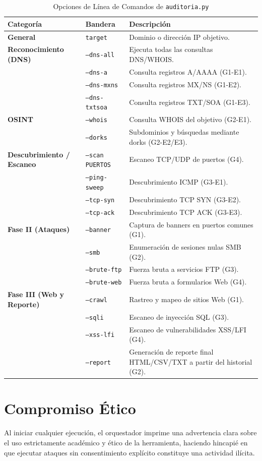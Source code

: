 \documentclass[12pt,a4paper]{article}
\begin{document}
\begin{table}[h!]
\centering
\begin{tabular}{@{}llp{8cm}@{}}
\toprule
\textbf{Categoría} & \textbf{Bandera} & \textbf{Descripción} \\ \midrule
\textbf{General} & \texttt{target} & Dominio o dirección IP objetivo. \\ \midrule
\textbf{Reconocimiento (DNS)} & \texttt{--dns-all} & Ejecuta todas las consultas DNS/WHOIS. \\
 & \texttt{--dns-a} & Consulta registros A/AAAA (G1-E1). \\
 & \texttt{--dns-mxns} & Consulta registros MX/NS (G1-E2). \\
 & \texttt{--dns-txtsoa} & Consulta registros TXT/SOA (G1-E3). \\ \midrule
\textbf{OSINT} & \texttt{--whois} & Consulta WHOIS del objetivo (G2-E1). \\
 & \texttt{--dorks} & Subdominios y búsquedas mediante dorks (G2-E2/E3). \\ \midrule
\textbf{Descubrimiento / Escaneo} & \texttt{--scan PUERTOS} & Escaneo TCP/UDP de puertos (G4). \\
 & \texttt{--ping-sweep} & Descubrimiento ICMP (G3-E1). \\
 & \texttt{--tcp-syn} & Descubrimiento TCP SYN (G3-E2). \\
 & \texttt{--tcp-ack} & Descubrimiento TCP ACK (G3-E3). \\ \midrule
\textbf{Fase II (Ataques)} & \texttt{--banner} & Captura de banners en puertos comunes (G1). \\
 & \texttt{--smb} & Enumeración de sesiones nulas SMB (G2). \\
 & \texttt{--brute-ftp} & Fuerza bruta a servicios FTP (G3). \\
 & \texttt{--brute-web} & Fuerza bruta a formularios Web (G4). \\ \midrule
\textbf{Fase III (Web y Reporte)} & \texttt{--crawl} & Rastreo y mapeo de sitios Web (G1). \\
 & \texttt{--sqli} & Escaneo de inyección SQL (G3). \\
 & \texttt{--xss-lfi} & Escaneo de vulnerabilidades XSS/LFI (G4). \\
 & \texttt{--report} & Generación de reporte final HTML/CSV/TXT a partir del historial (G2). \\ \bottomrule
\end{tabular}
\caption{Opciones de Línea de Comandos de \texttt{auditoria.py}}
\label{tab:opciones}
\end{table}

\section{Compromiso Ético}
Al iniciar cualquier ejecución, el orquestador imprime una advertencia clara sobre el uso estrictamente académico y ético de la herramienta, haciendo hincapié en que ejecutar ataques sin consentimiento explícito constituye una actividad ilícita.
\end{document}
